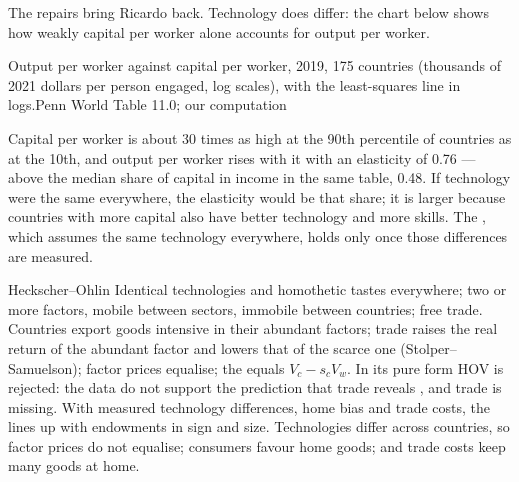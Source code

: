 The repairs bring Ricardo back. Technology does differ: the chart below shows
how weakly capital per worker alone accounts for output per worker.

\begin{omchart}{Output per worker against capital per worker, 2019, 175
countries (thousands of 2021 dollars per person engaged, log scales), with the
least-squares line in logs.}{Penn World Table 11.0; our computation}
\end{omchart}

Capital per worker is about 30 times as high at the 90th percentile of
countries as at the 10th, %
and output per worker rises with it with an elasticity of 0.76 --- above the
median share of capital in income in the same table, 0.48. If technology were the
same everywhere, the elasticity would be that share; it is larger because
countries with more capital also have better technology and more skills. The , which
assumes the same technology everywhere, holds only once those differences are
measured.

\begin{model}{Heckscher--Ohlin}
\assumes Identical technologies and homothetic tastes everywhere; two or more
factors, mobile between sectors, immobile between countries; free trade.
\predicts Countries export goods intensive in their abundant factors; trade
raises the real return of the abundant factor and lowers that of the scarce one
(Stolper--Samuelson); factor prices equalise; the 
equals $V_c - s_c V_w$.
\tested In its pure form HOV is rejected: the data do not support the prediction
that trade reveals , and trade is missing. With measured
technology differences, home bias and trade costs, the 
lines up with endowments in sign and size.
\breaks Technologies differ across countries, so factor prices do not equalise;
consumers favour home goods; and trade costs keep many goods at home.
\end{model}

